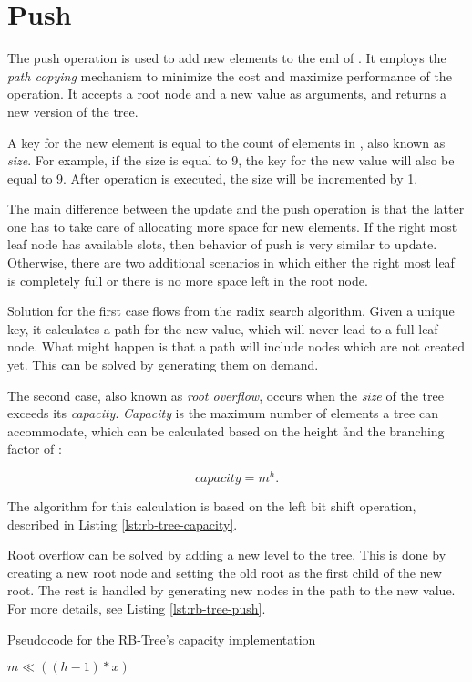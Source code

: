 \section{Push} 
The push operation is used to add new elements to the end of \rbtree. It employs the \emph{path copying} mechanism to minimize the cost and maximize performance of the operation. It accepts a root node and a new value as arguments, and returns a new version of the tree. 

A key for the new element is equal to the count of elements in \rbtree, also known as \emph{size}. For example, if the size is equal to 9, the key for the new value will also be equal to 9. After operation is executed, the size will be incremented by 1. 

The main difference between the update and the push operation is that the latter one has to take care of allocating more space for new elements. If the right most leaf node has available slots, then behavior of push is very similar to update. Otherwise, there are two additional scenarios in which either the right most leaf is completely full or there is no more space left in the root node. 

Solution for the first case flows from the radix search algorithm. Given a unique key, it calculates a path for the new value, which will never lead to a full leaf node. What might happen is that a path will include nodes which are not created yet. This can be solved by generating them on demand. 

The second case, also known as \emph{root overflow}, occurs when the \emph{size} of the tree exceeds its \emph{capacity}. \emph{Capacity} is the maximum number of elements a tree can accommodate, which can be calculated based on the height \h and the branching factor \m of \rbtree:

\begin{equation}
	capacity = m^h.
\end{equation}

The algorithm for this calculation is based on the left bit shift operation, described in Listing \ref{lst:rb-tree-capacity}. 

Root overflow can be solved by adding a new level to the tree. This is done by creating a new root node and setting the old root as the first child of the new root. The rest is handled by generating new nodes in the path to the new value. For more details, see Listing \ref{lst:rb-tree-push}. 

\begin{listing}[ht!]    
    \label{lst:rb-tree-capacity}
    \caption{Pseudocode for the RB-Tree's capacity implementation}
    
    \begin{algorithmic}
		\State \Return $m \ll ((h - 1) * x)$
        \EndFunction
    \end{algorithmic}
\end{listing}

